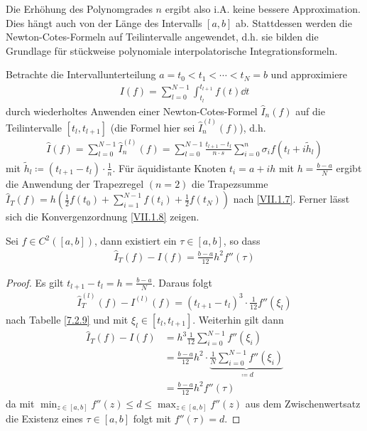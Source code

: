 Die Erhöhung des Polynomgrades $n$
ergibt also
i.A. keine bessere Approximation.
Dies hängt auch von der Länge des
Intervalls $[a,b]$ ab.
Stattdessen werden die
Newton-Cotes-Formeln auf
Teilintervalle angewendet, 
d.h. sie bilden die Grundlage für
stückweise polynomiale
interpolatorische Integrationsformeln.

Betrachte die Intervallunterteilung 
$a=t_0<t_1<\dotsb<t_N=b$ und approximiere
\begin{gather*}
  I(f) = \sum_{l=0}^{N-1}\int_{t_l}^{t_{l+1}}f(t)\dd t
\end{gather*}
durch wiederholtes Anwenden einer Newton-Cotes-Formel
$\hat{I}_n(f)$ auf die Teilintervalle $[t_l, t_{l+1}]$
(die Formel hier sei $\hat{I}_n^{(l)}(f)$),
d.h.
\begin{gather}
  \hat{I}(f) = \sum_{l=0}^{N-1}\hat{I}_n^{(l)}(f)
  = \sum_{l=0}^{N-1}\frac{t_{l+1}-t_l}{n\cdot s}
  \sum_{i=0}^n \sigma_i f(t_l+i\widetilde{h}_l)
  \label{VII.2.11}
\end{gather}
mit $\widetilde{h}_l\coloneqq (t_{l+1}-t_l)\cdot \frac{1}{n}$.
Für äquidistante Knoten $t_i=a+ih$ mit $h=\frac{b-a}{N}$
ergibt die Anwendung der Trapezregel $(n=2)$
die Trapezsumme 
$\hat{I}_T(f) = h\left(
  \frac{1}{2}f(t_0)+\sum_{i=1}^{N-1}f(t_i) +\frac{1}{2}f(t_N)
\right)$
nach \eqref{VII.1.7}. 
Ferner lässt sich die Konvergenzordnung \eqref{VII.1.8} zeigen.


\begin{Leme}\label{7.2.11}
  Sei $f\in C^2([a,b])$, dann existiert ein $\tau \in[a,b]$, so dass
  \begin{gather}
    \hat{I}_T(f) -I(f) = \frac{b-a}{12}h^2 f''(\tau)
    \label{VII.2.12}
  \end{gather}

  \begin{proof}
    Es gilt $t_{l+1}-t_l = h= \frac{b-a}{N}$.
    Daraus folgt
    \begin{gather*}
      \hat{I}_T^{(l)}(f)-I^{(l)}(f)=(t_{l+1}-t_l)^3\cdot\frac{1}{12}f''(\xi_l)
    \end{gather*}
    nach Tabelle \ref{7.2.9} und mit
    $\xi_l\in[t_l,t_{l+1}]$.
    Weiterhin gilt dann
    \begin{align*}
      \hat{I}_T(f) - I(f) &= h^3\frac{1}{12}\sum_{i=0}^{N-1}f''(\xi_i)\\
                          &= \frac{b-a}{12}h^2 \cdot \underbrace{
                            \frac{1}{N}\sum_{i=0}^{N-1}f''(\xi_i)
                            }_{\coloneqq d}\\
                          &= \frac{b-a}{12}h^2 f''(\tau)
    \end{align*}
    da mit $\min_{z\in[a,b]} f''(z) \leq d \leq \max_{z\in[a,b]}f''(z)$
    aus dem Zwischenwertsatz die Existenz eines $\tau\in[a,b]$ folgt
    mit $f''(\tau) = d$.
  \end{proof}
\end{Leme}

